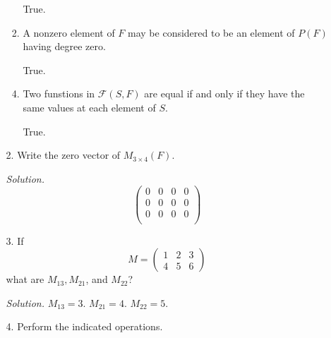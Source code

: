 \documentclass{article}
\theoremstyle{claim}
\theoremstyle{definition}
\begin{document}
\begin{enumerate}
\begin{enumerate}
\begin{enumerate}
                    \item[] True.
                    \item A nonzero element of $F$ may be considered to be an element of $P(F)$ having degree zero.
                    \item[] True.
                    \item Two funstions in $\mathcal{F}(S,F)$ are equal if and only if they have the same values at each element of $S$.
                    \item[] True.
                \end{enumerate}
            \item[2.] Write the zero vector of $M_{3 \times 4}(F)$.
            \item[] \emph{Solution. }\
                \begin{equation*}
                    \begin{pmatrix}
                        0 & 0 & 0 & 0\\
                        0 & 0 & 0 & 0\\
                        0 & 0 & 0 & 0\\
                    \end{pmatrix}
                \end{equation*}
            \item[3.] If
                \begin{equation*}
                    M =
                    \begin{pmatrix}
                        1 & 2 & 3\\
                        4 & 5 & 6
                    \end{pmatrix}
                \end{equation*}
                what are $M_{13}, M_{21}$, and $M_{22}$?
            \item[] \emph{Solution. } $M_{13} = 3$. $M_{21} = 4$. $M_{22} = 5$.
            \item[4.] Perform the indicated operations.
                \begin{enumerate}
                    \item[(a)]
                        $\begin{pmatrix}
                            2 & 5 & -3\\
                            1 & 0 & 7
                        \end{pmatrix} +
                        \begin{pmatrix}

\end{pmatrix}
\end{enumerate}
\end{enumerate}
\end{enumerate}
\end{document}
